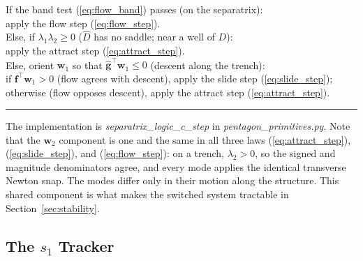 \documentclass[lettersize,journal]{IEEEtran}
\begin{document}
\vspace{3pt}
\noindent If the band test (\ref{eq:flow_band}) passes (on the
separatrix):\\
\hspace*{1.5em} apply the flow step (\ref{eq:flow_step}).\\
Else, if $\lambda_1 \lambda_2 \geq 0$ ($\hat{D}$ has no saddle; near a
well of $D$):\\
\hspace*{1.5em} apply the attract step (\ref{eq:attract_step}).\\
Else, orient $\mathbf{w}_1$ so that $\hat{\mathbf{g}}^\top \mathbf{w}_1
\leq 0$ (descent along the trench):\\
\hspace*{1.5em} if $\mathbf{f}^\top \mathbf{w}_1 > 0$ (flow agrees with
descent), apply the slide step (\ref{eq:slide_step});\\
\hspace*{1.5em} otherwise (flow opposes descent), apply the attract
step (\ref{eq:attract_step}).
\vspace{4pt}
\hrule
\vspace{4pt}

The implementation is \textit{separatrix\_logic\_c\_step} in
\textit{pentagon\_primitives.py}. Note that the $\mathbf{w}_2$
component is one and the same in all three laws
(\ref{eq:attract_step}), (\ref{eq:slide_step}), and
(\ref{eq:flow_step}): on a trench, $\lambda_2 > 0$, so the signed and
magnitude denominators agree, and every mode applies the identical
transverse Newton snap. The modes differ only in their motion along the
structure. This shared component is what makes the switched system
tractable in Section~\ref{sec:stability}.

\subsection{The $s_1$ Tracker}
\label{sec:oecs_controller}
\end{document}
